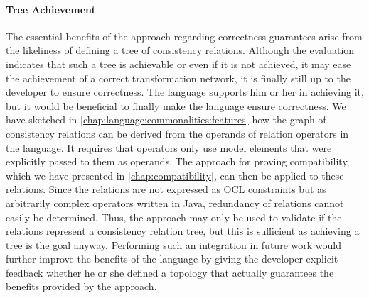 \paragraph{Tree Achievement}
The essential benefits of the \commonalities approach regarding correctness guarantees arise from the likeliness of defining a tree of consistency relations.
Although the evaluation indicates that such a tree is achievable or even if it is not achieved, it may ease the achievement of a correct transformation network, it is finally still up to the developer to ensure correctness.
The language supports him or her in achieving it, but it would be beneficial to finally make the language ensure correctness.
We have sketched in \autoref{chap:language:commonalities:features} how the graph of consistency relations can be derived from the operands of relation operators in the \commonalities language.
It requires that operators only use model elements that were explicitly passed to them as operands.
The approach for proving compatibility, which we have presented in \autoref{chap:compatibility}, can then be applied to these relations.
Since the relations are not expressed as \gls{OCL} constraints but as arbitrarily complex operators written in Java, redundancy of relations cannot easily be determined.
Thus, the approach may only be used to validate if the relations represent a consistency relation tree, but this is sufficient as achieving a tree is the goal anyway.
Performing such an integration in future work would further improve the benefits of the language by giving the developer explicit feedback whether he or she defined a topology that actually guarantees the benefits provided by the \commonalities approach.

